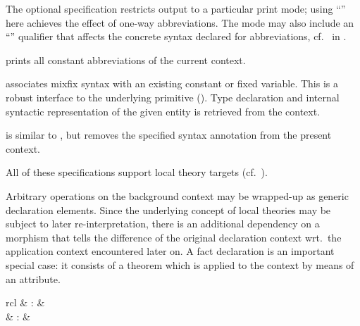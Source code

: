 \begin{isabellebody}
\begin{isamarkuptext}
\begin{descr}
  The optional  specification restricts output to a
  particular print mode; using ``'' here achieves the
  effect of one-way abbreviations.  The mode may also include an
  ``\mbox{}'' qualifier that affects the concrete syntax
  declared for abbreviations, cf.\ \mbox{} in
  .
  
  \item [\mbox{\isa{\isacommand{print{\isacharunderscore}abbrevs}}}] prints all constant abbreviations
  of the current context.
  
  \item [\mbox{\isa{\isacommand{notation}}}~\isa{c\ {\isacharparenleft}mx{\isacharparenright}}] associates mixfix
  syntax with an existing constant or fixed variable.  This is a
  robust interface to the underlying \mbox{} primitive
  ().  Type declaration and internal syntactic
  representation of the given entity is retrieved from the context.
  
  \item [\mbox{\isa{\isacommand{no{\isacharunderscore}notation}}}] is similar to \mbox{}, but removes the specified syntax annotation from the
  present context.

  \end{descr}

  All of these specifications support local theory targets (cf.\
  ).%
\end{isamarkuptext}%
\isamarkuptrue%
%
\isamarkuptrue%
%
\begin{isamarkuptext}%
Arbitrary operations on the background context may be wrapped-up as
  generic declaration elements.  Since the underlying concept of local
  theories may be subject to later re-interpretation, there is an
  additional dependency on a morphism that tells the difference of the
  original declaration context wrt.\ the application context
  encountered later on.  A fact declaration is an important special
  case: it consists of a theorem which is applied to the context by
  means of an attribute.

  \begin{matharray}{rcl}
    \mbox{} & : &  \\
    \indexdef{}{command}{declare}\mbox{\isa{\isacommand{declare}}} & : & \isarkeep{local{\dsh}theory} \\
  \end{matharray}


\end{isamarkuptext}
\end{isabellebody}
